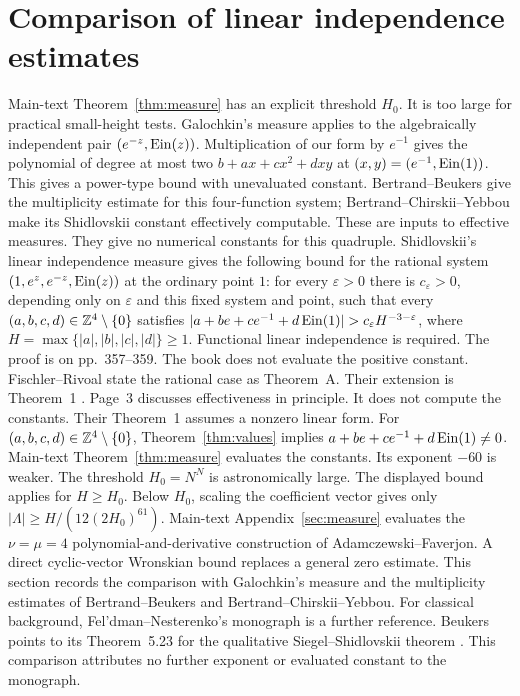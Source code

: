 \section{Comparison of linear independence estimates}\label{sup:measure-comparison}
Main-text Theorem~\ref{thm:measure} has an explicit threshold $H_0$.
It is too large for practical small-height tests.
Galochkin's measure \cite[theorem, p.~241]{Galochkin1968} applies to the
algebraically independent pair $(e^{-z},\operatorname{Ein}(z))$. Multiplication of our
form by $e^{-1}$ gives the polynomial of degree at most two $b+ax+cx^2+dxy$ at
$(x,y)=(e^{-1},\operatorname{Ein}(1))$. This gives a power-type bound with unevaluated
constant. Bertrand--Beukers \cite[Theorem~1, p.~182]{BertrandBeukers1985}
give the multiplicity estimate for this four-function system;
Bertrand--Chirskii--Yebbou \cite[Theorem~1.2, p.~245]{BertrandChirskiiYebbou2004}
make its Shidlovskii constant effectively computable.
These are inputs to effective measures.
They give no numerical constants for this quadruple.
Shidlovskii's linear independence measure
\cite[Chapter~11, \S2, Theorem~1, (32), p.~357]{Shidlovskii1989}
gives the following bound for the rational system $(1,e^z,e^{-z},\operatorname{Ein}(z))$
at the ordinary point $1$: for every $\varepsilon>0$ there is
$c_\varepsilon>0$, depending only on $\varepsilon$ and this fixed system
and point, such that every $(a,b,c,d)\in\mathbb{Z}^4\setminus\{0\}$ satisfies
$\lvert a+be+ce^{-1}+d\operatorname{Ein}(1)\rvert>c_\varepsilon H^{-3-\varepsilon}$,
where $H=\max\{\lvert a\rvert,\lvert b\rvert,\lvert c\rvert,\lvert d\rvert\}\ge1$.
Functional linear independence is required.
The proof is on pp.~357--359.
The book does not evaluate the positive constant.
Fischler--Rivoal state the rational case as Theorem~A.
Their extension is Theorem~1 \cite[pp.~2--3]{FischlerRivoal2024}.
Page~3 discusses effectiveness in principle.
It does not compute the constants.
Their Theorem~1 assumes a nonzero linear form.
For $(a,b,c,d)\in\mathbb{Z}^4\setminus\{0\}$, Theorem~\ref{thm:values}
implies $a+be+ce^{-1}+d\operatorname{Ein}(1)\ne0$.
Main-text Theorem~\ref{thm:measure} evaluates the constants.
Its exponent $-60$ is weaker.
The threshold $H_0=N^N$ is astronomically large.
The displayed bound applies for $H\ge H_0$. Below $H_0$, scaling the coefficient vector
gives only $|\Lambda|\ge H/(12(2H_0)^{61})$.
Main-text Appendix~\ref{sec:measure} evaluates the $\nu=\mu=4$ polynomial-and-derivative
construction of Adamczewski--Faverjon.
A direct cyclic-vector Wronskian bound replaces a general zero estimate.
This section records the comparison with Galochkin's measure
and the multiplicity estimates of Bertrand--Beukers and
Bertrand--Chirskii--Yebbou.
For classical background, Fel'dman--Nesterenko's monograph
\cite{FeldmanNesterenko1998} is a further reference. Beukers points to its
Theorem~5.23 for the qualitative Siegel--Shidlovskii theorem
\cite[p.~369]{Beukers2006}.
This comparison attributes no further exponent or evaluated constant to the monograph.
